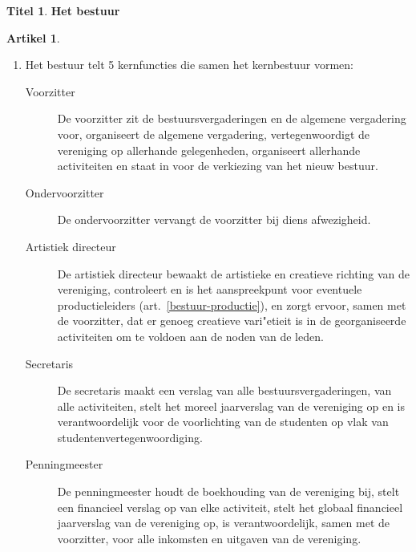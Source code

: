 \documentclass[a4paper,10pt]{article}
\theoremstyle{definition}
\newtheorem{titel}{\newline\Large Titel}
\newtheorem{artikelbase}{\large Artikel}
\newenvironment{artikel}
  {\begin{artikelbase}}
  {\smallskip
   \end{artikelbase}}
\newcommand{\ttext}[1]{\Large \textbf{#1} \normalsize}
\newcommand{\ttextenum}{\mbox{}}
\begin{document}
\begin{titel}\ttext{Het bestuur}

  \begin{artikel}\ttextenum
    \begin{enumerate}
      \item Het bestuur telt 5 kernfuncties die samen het kernbestuur vormen:
      \begin{description}
        \item[Voorzitter]
          De voorzitter zit de bestuursvergaderingen en de algemene vergadering voor, organiseert de algemene vergadering, vertegenwoordigt de vereniging op allerhande gelegenheden, organiseert allerhande activiteiten en staat in voor de verkiezing van het nieuw bestuur.
        \item[Ondervoorzitter]
          De ondervoorzitter vervangt de voorzitter bij diens afwezigheid.
        \item[Artistiek directeur]
          De artistiek directeur bewaakt de artistieke en creatieve richting van de vereniging, controleert en is het aanspreekpunt voor eventuele productieleiders (art.~\ref{bestuur-productie}), en zorgt ervoor, samen met de voorzitter, dat er genoeg creatieve vari"etieit is in de georganiseerde activiteiten om te voldoen aan de noden van de leden.
        \item[Secretaris]
          De secretaris maakt een verslag van alle bestuursvergaderingen, van alle activiteiten, stelt het moreel jaarverslag van de vereniging op en is verantwoordelijk voor de voorlichting van de studenten op vlak van studentenvertegenwoordiging.
        \item[Penningmeester]
          De penningmeester houdt de boekhouding van de vereniging bij, stelt een financieel verslag op van elke activiteit, stelt het globaal financieel jaarverslag van de vereniging op, is verantwoordelijk, samen met de voorzitter, voor alle inkomsten en uitgaven van de vereniging.
      \end{description}


\end{enumerate}
\end{artikel}
\end{titel}
\end{document}
